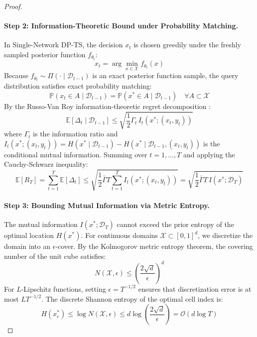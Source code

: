 \documentclass{article}
\begin{document}
\begin{proof}
\paragraph{Step 2: Information-Theoretic Bound under Probability Matching.}
In Single-Network DP-TS, the decision $x_t$ is chosen greedily under the freshly sampled posterior function $f_{\theta_t}$:
\begin{equation}
x_t = \arg\min_{x \in \mathcal{X}} f_{\theta_t}(x)
\end{equation}
Because $f_{\theta_t} \sim \Pi(\cdot \mid \mathcal{D}_{t-1})$ is an exact posterior function sample, the query distribution satisfies exact probability matching:
\begin{equation}
\mathbb{P}(x_t \in A \mid \mathcal{D}_{t-1}) = \mathbb{P}(x^* \in A \mid \mathcal{D}_{t-1}) \quad \forall A \subset \mathcal{X}
\end{equation}
By the Russo-Van Roy information-theoretic regret decomposition \citep{russo2014learning,russo2018tutorial}:
\begin{equation}
\mathbb{E}[\Delta_t \mid \mathcal{D}_{t-1}] \le \sqrt{\frac{1}{2} \Gamma_t \, I_t(x^*; (x_t, y_t))}
\end{equation}
where $\Gamma_t$ is the information ratio and $I_t(x^*; (x_t, y_t)) = H(x^* \mid \mathcal{D}_{t-1}) - H(x^* \mid \mathcal{D}_{t-1}, (x_t, y_t))$ is the conditional mutual information. Summing over $t = 1, \dots, T$ and applying the Cauchy-Schwarz inequality:
\begin{equation}
\mathbb{E}[R_T] = \sum_{t=1}^T \mathbb{E}[\Delta_t] \le \sqrt{\frac{1}{2} \bar{\Gamma} T \sum_{t=1}^T I_t(x^*; (x_t, y_t))} = \sqrt{\frac{1}{2} \bar{\Gamma} T \, I(x^*; \mathcal{D}_T)}
\end{equation}

\paragraph{Step 3: Bounding Mutual Information via Metric Entropy.}
The mutual information $I(x^*; \mathcal{D}_T)$ cannot exceed the prior entropy of the optimal location $H(x^*)$. For continuous domains $\mathcal{X} \subset [0, 1]^d$, we discretize the domain into an $\epsilon$-cover. By the Kolmogorov metric entropy theorem, the covering number of the unit cube satisfies:
\begin{equation}
N(\mathcal{X}, \epsilon) \le \left(\frac{2\sqrt{d}}{\epsilon}\right)^d
\end{equation}
For $L$-Lipschitz functions, setting $\epsilon = T^{-1/2}$ ensures that discretization error is at most $L T^{-1/2}$. The discrete Shannon entropy of the optimal cell index is:
\begin{equation}
H(x^*_\epsilon) \le \log N(\mathcal{X}, \epsilon) \le d \log\left(\frac{2\sqrt{d}}{\epsilon}\right) = \mathcal{O}(d \log T)
\end{equation}


\end{proof}
\end{document}
